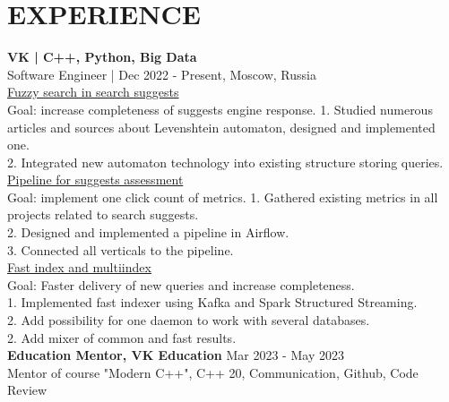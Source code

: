 \documentclass{resume} %
\begin{document}
\section*{EXPERIENCE}
\textbf{VK | C++, Python, Big Data} \\
Software Engineer | Dec 2022 - Present, Moscow, Russia \\
\uline{Fuzzy search in search suggests}\\
Goal: increase completeness of suggests engine response.
1. Studied numerous articles and sources about Levenshtein automaton, designed and implemented one.\\
2. Integrated new automaton technology into existing structure storing queries.\\
\uline{Pipeline for suggests assessment}\\
Goal: implement one click count of metrics.
1. Gathered existing metrics in all projects related to search suggests.\\
2. Designed and implemented a pipeline in Airflow.\\
3. Connected all verticals to the pipeline.\\
\uline{Fast index and multiindex}\\
Goal: Faster delivery of new queries and increase completeness.\\
1. Implemented fast indexer using Kafka and Spark Structured Streaming.\\
2. Add possibility for one daemon to work with several databases.\\
2. Add mixer of common and fast results.\\
\textbf{Education Mentor, VK Education} \hfill Mar 2023 - May 2023 \\
Mentor of course "Modern C++", C++ 20, Communication, Github, Code Review
\end{document}
